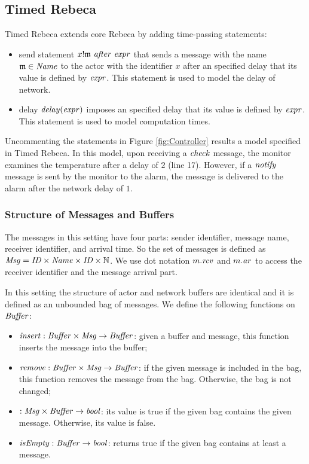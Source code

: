 \subsection{Timed Rebeca}
Timed Rebeca extends core Rebeca by adding time-passing statements:\begin{itemize}
    \item send statement $x!\mathfrak{m} ~{\it after} ~\mathit{expr}$ that sends a message with the name $\mathfrak{m}\in\mathit{Name}$ to the actor with the identifier $x$ after an specified delay that its value is defined by $\mathit{expr}$. This statement is used to model the delay of network.
    \item delay ${\it delay}({\it expr})$ imposes an specified delay that its value is defined by $\mathit{expr}$. This statement is used to model computation times. 
\end{itemize}

\begin{example}
Uncommenting the statements in Figure \ref{fig:Controller} results a model specified in Timed Rebeca. In this model, upon receiving a $\it check$ message, the monitor examines the temperature after a delay of $2$ (line 17). However, if a  $\it notify$ message is sent by the monitor to the alarm, the message is delivered to the alarm after the network delay of $1$.
\end{example}


\subsubsection{Structure of Messages and Buffers}
The messages in this setting have four parts: sender identifier, message name, receiver identifier, and arrival time. So the set of messages is defined as $\mathit{Msg} = \mathit{ID}\times\mathit{Name}\times \mathit{ID}\times \mathbb{N}$. We use dot notation $m.\mathit{rcv}$ and $m.\mathit{ar}$ to access the receiver identifier and the message arrival part. 


In this setting the structure of actor and network buffers are identical and it is defined as an unbounded bag of messages. %
We define the following functions on $\mathit{Buffer}$:\begin{itemize} 
\item $\mathit{insert}:\mathit{Buffer} \times \mathit{Msg}\rightarrow \mathit{Buffer}$: given a buffer and message, this function inserts the message into the buffer;
\item $\mathit{remove}:\mathit{Buffer} \times \mathit{Msg} \rightarrow \mathit{Buffer} $: if the given message is included in the bag, this function removes the message from the bag. Otherwise, the bag is not changed;
\item $:\mathit{Msg}\times \mathit{Buffer} \rightarrow \mathit{bool}$: its value is true if the given bag contains the given message. Otherwise, its value is false.
\item ${\it isEmpty}:\mathit{Buffer}\rightarrow \mathit{bool}$: returns true if the given bag contains at least a message.
\end{itemize}

